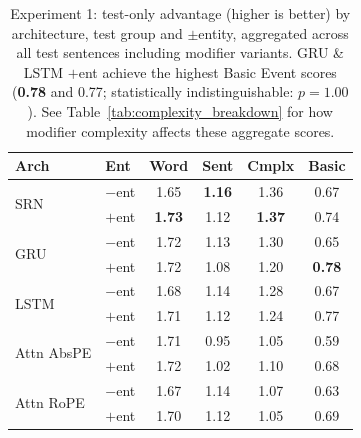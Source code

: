 \begin{table}[t]
\centering
\vspace{-0.5em}
\small
\begin{tabular}{@{}llcccc@{}}
\toprule
\textbf{Arch} & \textbf{Ent} & \textbf{Word} & \textbf{Sent} & \textbf{Cmplx} & \textbf{Basic} \\
\midrule
\multirow{2}{*}{SRN} & $-$ent & 1.65 & \textbf{1.16} & 1.36 & 0.67 \\
 & $+$ent & \textbf{1.73} & 1.12 & \textbf{1.37} & 0.74 \\
\midrule
\multirow{2}{*}{GRU} & $-$ent & 1.72 & 1.13 & 1.30 & 0.65 \\
 & $+$ent & 1.72 & 1.08 & 1.20 & \textbf{0.78} \\
\midrule
\multirow{2}{*}{LSTM} & $-$ent & 1.68 & 1.14 & 1.28 & 0.67 \\
 & $+$ent & 1.71 & 1.12 & 1.24 & 0.77 \\
\midrule
\multirow{2}{*}{Attn AbsPE} & $-$ent & 1.71 & 0.95 & 1.05 & 0.59 \\
 & $+$ent & 1.72 & 1.02 & 1.10 & 0.68 \\
\midrule
\multirow{2}{*}{Attn RoPE} & $-$ent & 1.67 & 1.14 & 1.07 & 0.63 \\
 & $+$ent & 1.70 & 1.12 & 1.05 & 0.69 \\
\bottomrule
\end{tabular}
\vspace{-0.7em}
\caption{\small Experiment 1: test-only advantage (higher is better) by architecture, test group and $\pm$entity, aggregated across all test sentences including modifier variants. GRU \& LSTM $+$ent achieve the highest Basic Event scores (\textbf{0.78} and 0.77; statistically indistinguishable: $p = 1.00$). See Table~\ref{tab:complexity_breakdown} for how modifier complexity affects these aggregate scores.}
\label{tab:main_results}
\end{table}
